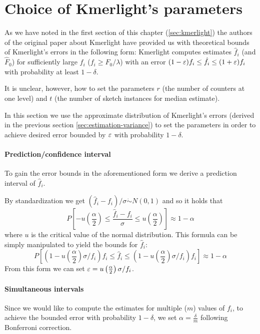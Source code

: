 \section{Choice of Kmerlight's parameters}
\label{sec:parameters-choice}

As we have noted in the first section of this chapter (\ref{sec:kmerlight})
the authors of the original paper about Kmerlight \cite{Sivadasan2016} have
provided us with theoretical bounds of Kmerlight's errors in the following form:
Kmerlight computes estimates $\hat f_i$ (and $\hat F_0$) for sufficiently large $f_i$ ($f_i \geq F_0 / \lambda$)
with an error $(1-\varepsilon)f_i \leq \hat f_i \leq (1+\varepsilon)f_i$ with probability at least $1 - \delta$.

It is unclear, however, how to set the parameters $r$ (the number of counters at one level) 
and $t$ (the number of sketch instances for median estimate).

In this section we use the approximate distribution of Kmerlight's errors (derived in the
previous section \ref{sec:estimation-variance}) to set the parameters in order to achieve
desired error bounded by $\varepsilon$ with probability $1-\delta$.

\paragraph{Prediction/confidence interval} To gain the error bounds
 in the
aforementioned form we derive a prediction interval of $\hat f_i$. 

By standardization we get $(\hat f_i - f_i)/\sigma \dot\sim N(0,1)$ and so it holds that
$$P\left[-u\left(\frac{\alpha}{2}\right) \leq \frac{\hat f_i - f_i}{\sigma} \leq u\left(\frac{\alpha}{2}\right) \right] \approx 1 - \alpha$$
where $u$ is the critical value of the normal distribution. This formula can be simply
manipulated to yield the bounds for $\hat f_i$:
$$P\left[\left(1-u\left(\frac{\alpha}{2}\right)\sigma/f_i\right) f_i \leq \hat f_i \leq \left(1-u\left(\frac{\alpha}{2}\right)\sigma/f_i\right) f_i \right] \approx 1 - \alpha$$
From this form we can set $\varepsilon = u\left(\frac{\alpha}{2}\right)\sigma/f_i$.

\paragraph{Simultaneous intervals} Since we would like to compute the estimates
for multiple ($m$) values of $f_i$, to achieve the bounded error with probability
$1 - \delta$, we set $\alpha = \frac{\delta}{m}$ following Bonferroni correction.

